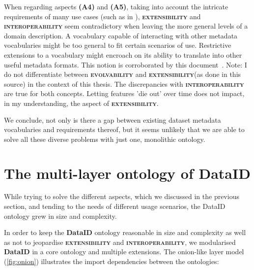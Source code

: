 \documentclass[a4paper,english,twoside,BCOR1.5cm,headsepline,DIV12,appendixprefix,final,12pt]{scrbook}
\newcommand{\extensibility}{{\ttfamily\scshape\bfseries extensibility}\xspace}
\newcommand{\interoperability}{{\ttfamily\scshape\bfseries interoperability}\xspace}
\newcommand{\evolvability}{{\ttfamily\scshape\bfseries evolvability}\xspace}
\newcommand{\dataid}{{\ttfamily\bfseries DataID}\xspace}
\begin{document}
When regarding aspects \textbf{(A4)} and \textbf{(A5)}, taking into account the intricate requirements of many use cases (such as in ), \extensibility and \interoperability seem contradictory when leaving the more general levels of a domain description. A vocabulary capable of interacting with other metadata vocabularies might be too general to fit certain scenarios of use. Restrictive extensions to a vocabulary might encroach on its ability to translate into other useful metadata formats. This notion is corroborated by this document~\cite{ivse}. Note: I do not differentiate between \evolvability and \extensibility (as done in this source) in the context of this thesis. The discrepancies with \interoperability are true for both concepts. Letting features 'die out' over time does not impact, in my understanding, the aspect of \extensibility. 

We conclude, not only is there a gap between existing dataset metadata vocabularies and requirements thereof, but it seems unlikely that we are able to solve all these diverse problems with just one, monolithic ontology.



\section{The multi-layer ontology of DataID} %
\label{sec:multilayer}

While trying to solve the different aspects, which we discussed in the previous section, and tending to the needs of different usage scenarios, the DataID ontology grew in size and complexity.

In order to keep the \dataid ontology reasonable in size and complexity as well as not to jeopardise \extensibility and \interoperability, we modularised \dataid in a core ontology and multiple extensions. The onion-like layer model (\cref{fig:onion}) illustrates the import dependencies between the ontologies: 
\end{document}
